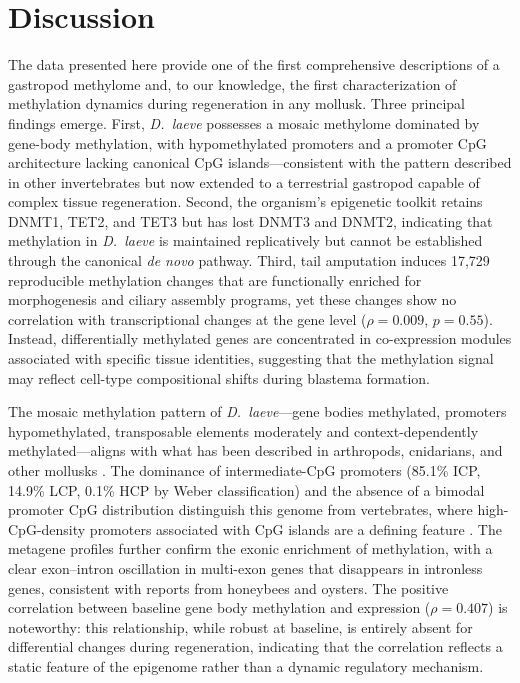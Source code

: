\documentclass[12pt]{article}
\begin{document}

\section*{Discussion}

The data presented here provide one of the first comprehensive descriptions of a gastropod methylome and, to our knowledge, the first characterization of methylation dynamics during regeneration in any mollusk. Three principal findings emerge. First, \textit{D.\ laeve} possesses a mosaic methylome dominated by gene-body methylation, with hypomethylated promoters and a promoter CpG architecture lacking canonical CpG islands---consistent with the pattern described in other invertebrates but now extended to a terrestrial gastropod capable of complex tissue regeneration. Second, the organism's epigenetic toolkit retains DNMT1, TET2, and TET3 but has lost DNMT3 and DNMT2, indicating that methylation in \textit{D.\ laeve} is maintained replicatively but cannot be established through the canonical \textit{de novo} pathway. Third, tail amputation induces 17,729 reproducible methylation changes that are functionally enriched for morphogenesis and ciliary assembly programs, yet these changes show no correlation with transcriptional changes at the gene level ($\rho = 0.009$, $p = 0.55$). Instead, differentially methylated genes are concentrated in co-expression modules associated with specific tissue identities, suggesting that the methylation signal may reflect cell-type compositional shifts during blastema formation.

The mosaic methylation pattern of \textit{D.\ laeve}---gene bodies methylated, promoters hypomethylated, transposable elements moderately and context-dependently methylated---aligns with what has been described in arthropods, cnidarians, and other mollusks \cite{sardaEvolutionInvertebrateGene2012, haidarDNAMethylationMachinery2024}. The dominance of intermediate-CpG promoters (85.1\% ICP, 14.9\% LCP, 0.1\% HCP by Weber classification) and the absence of a bimodal promoter CpG distribution distinguish this genome from vertebrates, where high-CpG-density promoters associated with CpG islands are a defining feature \cite{gardiner-gardenCpGIslandsVertebrate1987}. The metagene profiles further confirm the exonic enrichment of methylation, with a clear exon--intron oscillation in multi-exon genes that disappears in intronless genes, consistent with reports from honeybees and oysters. The positive correlation between baseline gene body methylation and expression ($\rho = 0.407$) is noteworthy: this relationship, while robust at baseline, is entirely absent for differential changes during regeneration, indicating that the correlation reflects a static feature of the epigenome rather than a dynamic regulatory mechanism.
\end{document}
